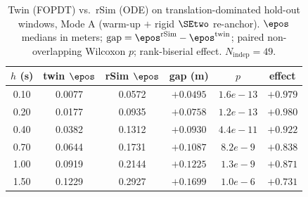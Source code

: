 %
\begin{table}[t]
  \caption{Twin (FOPDT) vs.\ rSim (ODE) on translation-dominated hold-out windows,
  Mode A (warm-up $+$ rigid $\SEtwo$ re-anchor). $\epos$ medians in meters;
  $\mathrm{gap}=\epos^{\mathrm{rSim}}-\epos^{\mathrm{twin}}$; paired
  non-overlapping Wilcoxon $p$; rank-biserial effect. $N_{\mathrm{indep}}=49$.}
  \label{tab:twinvsrsim}
  \centering
  \setlength{\tabcolsep}{4pt}
  \begin{tabular}{cccccc}
    \toprule
    $h$ (s) & twin $\epos$ & rSim $\epos$ & gap (m) & $p$ & effect \\
    \midrule
    0.10 & 0.0077 & 0.0572 & $+0.0495$ & $1.6e{-}13$ & $+0.979$ \\
    0.20 & 0.0177 & 0.0935 & $+0.0758$ & $1.2e{-}13$ & $+0.980$ \\
    0.40 & 0.0382 & 0.1312 & $+0.0930$ & $4.4e{-}11$ & $+0.922$ \\
    0.70 & 0.0644 & 0.1731 & $+0.1087$ & $8.2e{-}9$  & $+0.838$ \\
    1.00 & 0.0919 & 0.2144 & $+0.1225$ & $1.3e{-}9$  & $+0.871$ \\
    1.50 & 0.1229 & 0.2927 & $+0.1699$ & $1.0e{-}6$  & $+0.731$ \\
    \bottomrule
  \end{tabular}
\end{table}
